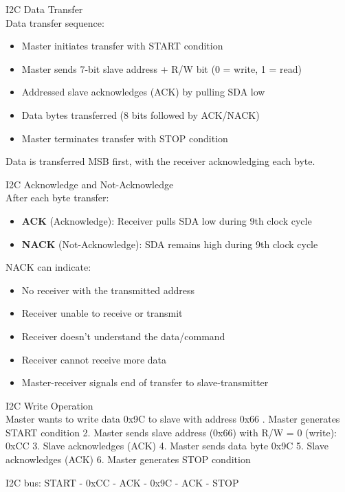 \begin{definition}{I2C Data Transfer}\\
Data transfer sequence:
\begin{itemize}
    \item Master initiates transfer with START condition
    \item Master sends 7-bit slave address + R/W bit (0 = write, 1 = read)
    \item Addressed slave acknowledges (ACK) by pulling SDA low
    \item Data bytes transferred (8 bits followed by ACK/NACK)
    \item Master terminates transfer with STOP condition
\end{itemize}
Data is transferred MSB first, with the receiver acknowledging each byte.
\end{definition}

\begin{concept}{I2C Acknowledge and Not-Acknowledge}\\
After each byte transfer:
\begin{itemize}
    \item \textbf{ACK} (Acknowledge): Receiver pulls SDA low during 9th clock cycle
    \item \textbf{NACK} (Not-Acknowledge): SDA remains high during 9th clock cycle
\end{itemize}
NACK can indicate:
\begin{itemize}
    \item No receiver with the transmitted address
    \item Receiver unable to receive or transmit
    \item Receiver doesn't understand the data/command
    \item Receiver cannot receive more data
    \item Master-receiver signals end of transfer to slave-transmitter
\end{itemize}
\end{concept}

\begin{example2}{I2C Write Operation}\\
Master wants to write data 0x9C to slave with address 0x66
. Master generates START condition
2. Master sends slave address (0x66) with R/W = 0 (write): 0xCC
3. Slave acknowledges (ACK)
4. Master sends data byte 0x9C
5. Slave acknowledges (ACK)
6. Master generates STOP condition

I2C bus:
START - 0xCC - ACK - 0x9C - ACK - STOP
\end{example2}


